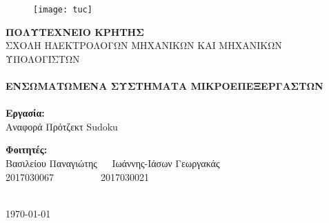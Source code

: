 \begin{titlepage}
\centering
\begin{figure}[h!]
\centering
\texttt{[image: tuc]}
\end{figure}
\textbf{\large ΠΟΛΥΤΕΧΝΕΙΟ ΚΡΗΤΗΣ}\\[0.3CM]
ΣΧΟΛΗ ΗΛΕΚΤΡΟΛΟΓΩΝ ΜΗΧΑΝΙΚΩΝ ΚΑΙ ΜΗΧΑΝΙΚΩΝ ΥΠΟΛΟΓΙΣΤΩΝ\\[1cm]
\HRule\\[0.15cm]
\Large{\textbf{ΕΝΣΩΜΑΤΩΜΕΝΑ ΣΥΣΤΗΜΑΤΑ ΜΙΚΡΟΕΠΕΞΕΡΓΑΣΤΩΝ}}\\[0.05cm]
\HRule\\[1cm]
\Large{\textbf{Εργασία:}}\\
\Large{Αναφορά Πρότζεκτ Sudoku}\\[1.5cm]
\begin{minipage}{0.9\textwidth}
\begin{flushleft}
\textbf{Φοιτητές:}\\
Βασιλείου Παναγιώτης$~~~~~~~$Ιωάννης-Ιάσων Γεωργακάς\\
2017030067$~~~~~~~~~~~~~~~~~~~~~~$2017030021\\[0.5cm]
\end{flushleft}
\end{minipage}\\[2cm]
{\large\today}\\
\end{titlepage}